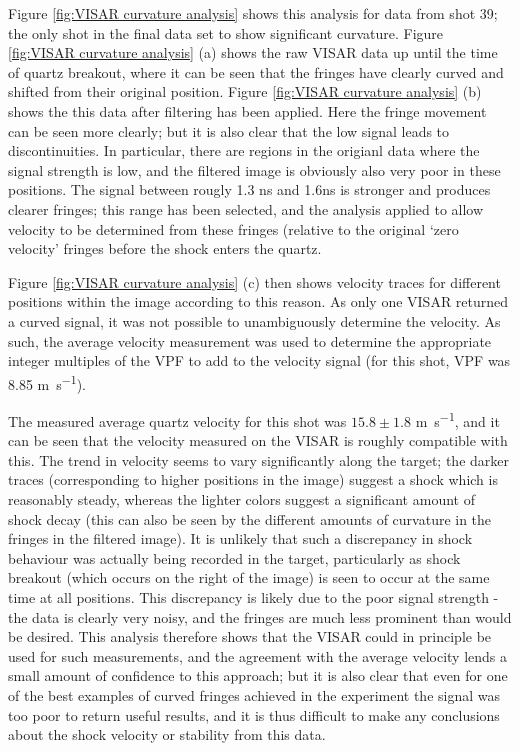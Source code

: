 Figure \ref{fig:VISAR curvature analysis} shows this analysis for data from shot 39; the only shot in the final data set to show significant curvature. Figure \ref{fig:VISAR curvature analysis} (a) shows the raw VISAR data up until the time of quartz breakout, where it can be seen that the fringes have clearly curved and shifted from their original position. Figure \ref{fig:VISAR curvature analysis} (b) shows the this data after filtering has been applied. Here the fringe movement can be seen more clearly; but it is also clear that the low signal leads to discontinuities. In particular, there are regions in the origianl data where the signal strength is low, and the filtered image is obviously also very poor in these positions. The signal between rougly 1.3 ns and 1.6ns is stronger and produces clearer fringes; this range has been selected, and the analysis applied to allow velocity to be determined from these fringes (relative to the original `zero velocity' fringes before the shock enters the quartz.

Figure \ref{fig:VISAR curvature analysis} (c) then shows velocity traces for different positions within the image according to this reason. As only one VISAR returned a curved signal, it was not possible to unambiguously determine the velocity. As such, the average velocity measurement was used to determine the appropriate integer multiples of the VPF to add to the velocity signal (for this shot, VPF was 8.85 \unit{\meter\per\second}).

The measured average quartz velocity for this shot was $15.8 \pm 1.8$ \unit{\meter\per\second}, and it can be seen that the velocity measured on the VISAR is roughly compatible with this. The trend in velocity seems to vary significantly along the target; the darker traces (corresponding to higher positions in the image) suggest a shock which is reasonably steady, whereas the lighter colors suggest a significant amount of shock decay (this can also be seen by the different amounts of curvature in the fringes in the filtered image). It is unlikely that such a discrepancy in shock behaviour was actually being recorded in the target, particularly as shock breakout (which occurs on the right of the image) is seen to occur at the same time at all positions. This discrepancy is likely due to the poor signal strength - the data is clearly very noisy, and the fringes are much less prominent than would be desired. This analysis therefore shows that the VISAR could in principle be used for such measurements, and the agreement with the average velocity lends a small amount of confidence to this approach; but it is also clear that even for one of the best examples of curved fringes achieved in the experiment the signal was too poor to return useful results, and it is thus difficult to make any conclusions about the shock velocity or stability from this data.




